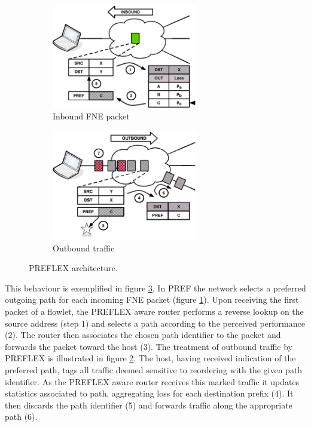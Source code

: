 \begin{figure}
    \begin{subfigure}[b]{0.5\textwidth}
        \centering
        \includegraphics[width=2.5in]{figures/preflex/preflex1}
        \caption{Inbound \acs{FNE} packet}
        \label{fig:preflexin}
    \end{subfigure}%
    \begin{subfigure}[b]{0.5\textwidth}
        \centering
        \includegraphics[width=2.5in]{figures/preflex/preflex2}
        \caption{Outbound traffic}
        \label{fig:preflexout}
    \end{subfigure}
    \caption{\acs{PREFLEX} architecture.}
    \label{fig:preflex}
\end{figure}

This behaviour is exemplified in figure \ref{fig:preflex}.  
In \ac{PREF} the network selects a preferred outgoing path for each incoming \ac{FNE} packet (figure \ref{fig:preflexin}). 
Upon receiving the first packet of a flowlet, the \ac{PREFLEX} aware router performs a reverse lookup on the source address (step 1) and selects a path according to the perceived performance (2). 
The router then associates the chosen path identifier to the packet and forwards the packet toward the host (3).
The treatment of outbound traffic by \ac{PREFLEX} is illustrated in figure \ref{fig:preflexout}. 
The host, having received indication of the preferred path, tags all traffic deemed sensitive to reordering with the given path identifier. 
As the \ac{PREFLEX} aware router receives this marked traffic it updates statistics associated to path, aggregating loss for each destination prefix (4). 
It then discards the path identifier (5) and forwards traffic along the appropriate path (6). 

